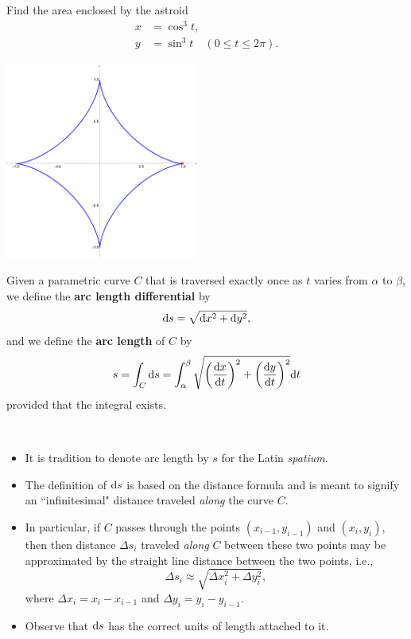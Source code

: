 \begin{example}
Find the area enclosed by the astroid
\begin{align*}
x &= \cos^3 t,\\
y &= \sin^3 t\quad (0\le t\le 2\pi).
\end{align*}
\begin{flushright}
\includegraphics[width=2.5in]{img/astroid}
\end{flushright}
\end{example}

\newpage

\begin{definition}
Given a parametric curve $C$ that is traversed exactly once as $t$ varies from $\alpha$ to $\beta$, we define the \textbf{arc length differential} by
\begin{equation*}
\mathrm{d} s = \sqrt{\mathrm{d} x^2 + \mathrm{d} y^2},
\end{equation*}
and we define the \textbf{arc length} of $C$ by
\begin{equation*}
s = \int_C\mathrm{d} s = \int_\alpha^\beta\sqrt{\left(\frac{\mathrm{d} x}{\mathrm{d} t}\right)^2 + \left(\frac{\mathrm{d} y}{\mathrm{d} t}\right)^2}\mathrm{d} t
\end{equation*}
provided that the integral exists.
\end{definition}

\begin{remark}\,
\begin{itemize}
\item It is tradition to denote arc length by $s$ for the Latin \textit{spatium}.
\item The definition of $\mathrm{d} s$ is based on the distance formula and is meant to signify an ``infinitesimal" distance traveled \textit{along} the curve $C$.  
\item In particular, if $C$ passes through the points $(x_{i-1}, y_{i-1})$ and $(x_i, y_i)$, then then distance $\Delta s_i$ traveled \textit{along} $C$ between these two points may be approximated by the straight line distance between the two points, i.e.,
\begin{equation*}
\Delta s_i \approx \sqrt{\Delta x_i^2 + \Delta y_i^2},
\end{equation*}
where $\Delta x_i = x_i-x_{i-1}$ and $\Delta y_i = y_i - y_{i-1}$.
\item Observe that $\mathrm{d} s$ has the correct units of length attached to it.
\end{itemize}
\end{remark}

